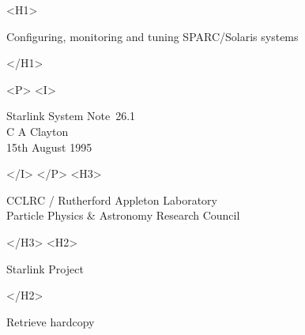 \documentclass[11pt]{article}
\newcommand{\stardoccategory}  {Starlink System Note}
\newcommand{\stardocnumber}    {26.1}
\newcommand{\stardocsource}    {ssn\stardocnumber}
\newcommand{\stardocauthors}   {C A Clayton}
\newcommand{\stardocdate}      {15th August 1995}
\newcommand{\stardoctitle}     {Configuring, monitoring and tuning SPARC/Solaris systems}
\newcommand{\htmladdnormallink}[2]{#1}
\newcommand{\htmladdimg}[1]{}
\newcommand{\htmlref}[2]{#1}
\newcommand{\htmladdtonavigation}[1]{}
\newcommand{\xlabel}[1]{}
\begin{document}
\begin{htmlonly}
   \xlabel{}
   \begin{rawhtml} <H1> \end{rawhtml}
      \stardoctitle
   \begin{rawhtml} </H1> \end{rawhtml}


   \begin{rawhtml} <P> <I> \end{rawhtml}
   \stardoccategory\ \stardocnumber \\
   \stardocauthors \\
   \stardocdate
   \begin{rawhtml} </I> </P> <H3> \end{rawhtml}
      \htmladdnormallink{CCLRC}{http://www.cclrc.ac.uk} /
      \htmladdnormallink{Rutherford Appleton Laboratory}
                        {http://www.cclrc.ac.uk/ral} \\
      Particle Physics \& Astronomy Research Council \\
   \begin{rawhtml} </H3> <H2> \end{rawhtml}
      \htmladdnormallink{Starlink Project}{http://www.starlink.ac.uk/}
   \begin{rawhtml} </H2> \end{rawhtml}
   \htmladdnormallink{\htmladdimg{source.gif} Retrieve hardcopy}
      {http://www.starlink.ac.uk/cgi-bin/hcserver?\stardocsource}\\



\end{htmlonly}
\end{document}
